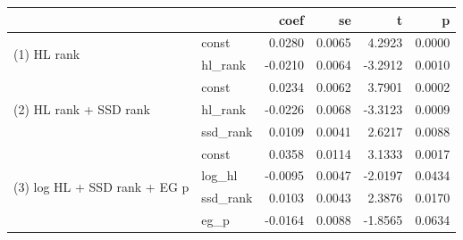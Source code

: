 \begin{tabular}{llrrrr}
\toprule
 &  & coef & se & t & p \\
\midrule
\multirow[t]{2}{*}{(1) HL rank} & const & 0.0280 & 0.0065 & 4.2923 & 0.0000 \\
 & hl_rank & -0.0210 & 0.0064 & -3.2912 & 0.0010 \\
\cline{1-6}
\multirow[t]{3}{*}{(2) HL rank + SSD rank} & const & 0.0234 & 0.0062 & 3.7901 & 0.0002 \\
 & hl_rank & -0.0226 & 0.0068 & -3.3123 & 0.0009 \\
 & ssd_rank & 0.0109 & 0.0041 & 2.6217 & 0.0088 \\
\cline{1-6}
\multirow[t]{4}{*}{(3) log HL + SSD rank + EG p} & const & 0.0358 & 0.0114 & 3.1333 & 0.0017 \\
 & log_hl & -0.0095 & 0.0047 & -2.0197 & 0.0434 \\
 & ssd_rank & 0.0103 & 0.0043 & 2.3876 & 0.0170 \\
 & eg_p & -0.0164 & 0.0088 & -1.8565 & 0.0634 \\
\cline{1-6}
\bottomrule
\end{tabular}
